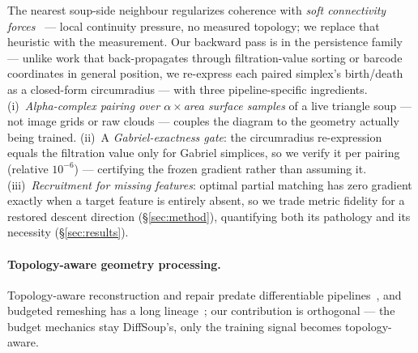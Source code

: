 The nearest soup-side neighbour regularizes coherence with \emph{soft
connectivity forces}~\citep{burgdorfer2025radiant} --- local continuity
pressure, no measured topology; we replace that heuristic with the
measurement. Our backward pass is in the persistence family
--- unlike work that back-propagates through filtration-value sorting or
barcode coordinates in general position, we re-express each paired
simplex's birth/death as a closed-form circumradius --- with three
pipeline-specific ingredients.
(i)~\emph{Alpha-complex pairing over $\alpha{\times}$area surface samples}
of a live triangle soup --- not image grids or raw clouds --- couples
the diagram to the geometry actually being trained.
(ii)~A \emph{Gabriel-exactness gate}: the circumradius re-expression
equals the filtration value only for Gabriel simplices, so we verify it
per pairing (relative $10^{-6}$) --- certifying the frozen gradient
rather than assuming it.
(iii)~\emph{Recruitment for missing features}: optimal partial matching
has zero gradient exactly when a target feature is entirely absent, so
we trade metric fidelity for a restored descent direction
(\S\ref{sec:method}), quantifying both its pathology and its necessity
(\S\ref{sec:results}).

\paragraph{Topology-aware geometry processing.}
Topology-aware reconstruction and repair predate differentiable
pipelines~\citep{sharf2007topologyaware,ju2004repair,attene2010repair}, and
budgeted remeshing has a long
lineage~\citep{hoppe1996progressive,garland1997qem,alliez2003anisotropic,botsch2004remeshing,dunyach2013adaptive};
our contribution is orthogonal --- the budget mechanics stay DiffSoup's,
only the training signal becomes topology-aware.
